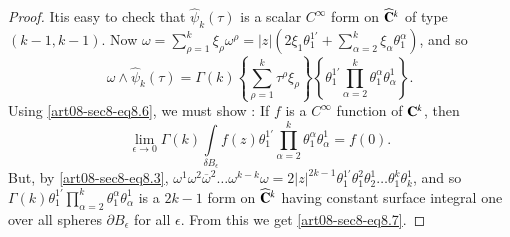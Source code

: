 \begin{proof}
It\pageoriginale is easy to check that $\widehat{\psi}_{k}(\tau)$ is a scalar $C^{\infty}$ form on $\widehat{\mathbf{C}}^{k}$ of type $(k-1,k-1)$. Now $\omega=\sum\limits^{k}_{\rho=1}\xi_{\rho}\omega^{\rho}=|z|(2\xi_{1}\theta^{1'}_{1}+\sum\limits^{k}_{\alpha=2}\xi_{\alpha}\theta^{\alpha}_{1})$, and so
\begin{equation}
\omega\wedge \widehat{\psi}_{k}(\tau)=\Gamma(k)\left\{\sum\limits^{k}_{\rho=1}\tau^{\rho}\xi_{\rho}\right\}\left\{\theta^{1'}_{1}\prod\limits^{k}_{\alpha=2}\theta^{\alpha}_{1}\theta^{1}_{\alpha}\right\}.\label{art08-sec8-eq8.6}
\end{equation}
Using \eqref{art08-sec8-eq8.6}, we must show : If $f$ is a $C^{\infty}$ function of $\mathbf{C}^{k}$, then
\begin{equation}
\lim\limits_{\epsilon\to 0}\Gamma(k)\int\limits_{\delta B_{\epsilon}}f(z)\theta^{1'}_{1}\prod\limits^{k}_{\alpha=2}\theta^{\alpha}_{1}\theta^{1}_{\alpha}=f(0).\label{art08-sec8-eq8.7}
\end{equation}
But, by \eqref{art08-sec8-eq8.3}, $\omega^{1}\omega^{2}\overline{\omega}^{2}\ldots\omega^{k-k}\omega=2|z|^{2k-1}\theta^{1'}_{1}\theta^{2}_{1}\theta^{1}_{2}\ldots\theta^{k}_{1}\theta^{1}_{k}$, and so\break $\Gamma(k)\theta^{1'}_{1}\prod\limits^{k}_{\alpha=2}\theta^{\alpha}_{1}\theta^{1}_{\alpha}$ is a $2k-1$ form on $\widehat{\mathbf{C}}^{k}$ having constant surface integral one over all spheres $\partial B_{\epsilon}$ for all $\epsilon$. From this we get \eqref{art08-sec8-eq8.7}.
\end{proof}

